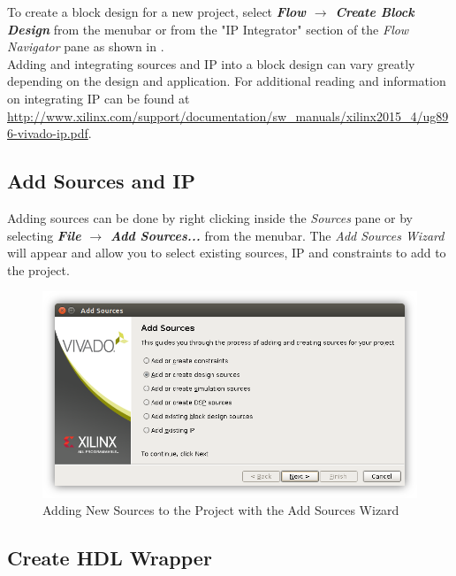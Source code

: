 \noindent
To create a block design for a new project, select \textit{\bfseries Flow $\rightarrow$ Create Block Design} from the menubar or from the "IP Integrator" section of the \textit{Flow Navigator} pane as shown in . \\

\noindent
Adding and integrating sources and IP into a block design can vary greatly depending on the design and application. For additional reading and information on integrating IP can be found at \url{http://www.xilinx.com/support/documentation/sw_manuals/xilinx2015_4/ug896-vivado-ip.pdf}. 

\newpage

\subsection{Add Sources and IP}
\label{sub:addsources}

Adding sources can be done by right clicking inside the \textit{Sources} pane or by selecting \textit{\bfseries File $\rightarrow$ Add Sources...} from the menubar. The \textit{Add Sources Wizard} will appear and allow you to select existing sources, IP and constraints to add to the project. \\


\begin{figure}
	\centering
	\includegraphics{images/Add_Sources_Dialog.png}
	\caption{Adding New Sources to the Project with the Add Sources Wizard}
	\label{fig:addsourceswiz}
\end{figure}


\subsection{Create HDL Wrapper}

